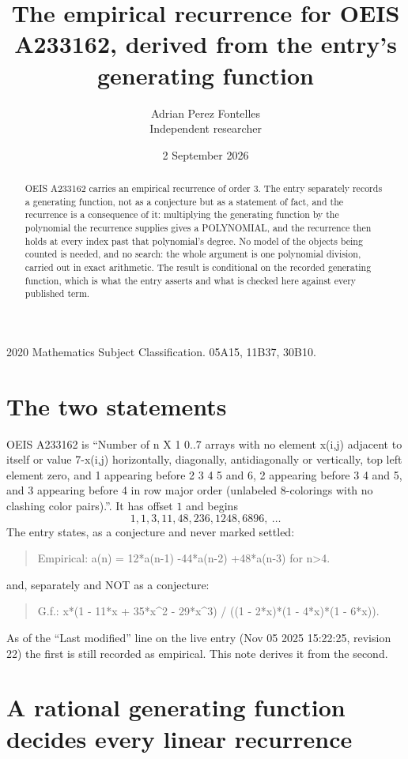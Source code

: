 \documentclass[11pt,a4paper]{article}
\title{The empirical recurrence for OEIS A233162, derived from the entry's generating function}
\author{Adrian Perez Fontelles\\ \small Independent researcher}
\date{2 September 2026}
\theoremstyle{plain}
\theoremstyle{definition}
\begin{document}
\maketitle

\begin{abstract}
OEIS A233162 carries an empirical recurrence of order $3$. The entry separately records a
generating function, not as a conjecture but as a statement of fact, and the recurrence is a
consequence of it: multiplying the generating function by the polynomial the recurrence
supplies gives a POLYNOMIAL, and the recurrence then holds at every index past that
polynomial's degree. No model of the objects being counted is needed, and no search: the
whole argument is one polynomial division, carried out in exact arithmetic. The result is
conditional on the recorded generating function, which is what the entry asserts and what is
checked here against every published term.
\end{abstract}

\noindent\small 2020 Mathematics Subject Classification. 05A15, 11B37, 30B10.\normalsize

\section{The two statements}

OEIS A233162 is ``Number of n X 1 0..7 arrays with no element x(i,j) adjacent to itself or value 7-x(i,j) horizontally, diagonally, antidiagonally or vertically, top left element zero, and 1 appearing before 2 3 4 5 and 6, 2 appearing before 3 4 and 5, and 3 appearing before 4 in row major order (unlabeled 8-colorings with no clashing color pairs).''. It has offset $1$ and begins
\[
1, 1, 3, 11, 48, 236, 1248, 6896,\ \dots
\]
The entry states, as a conjecture and never marked settled:
\begin{quote}
Empirical: a(n) = 12*a(n-1) -44*a(n-2) +48*a(n-3) for n>4.
\end{quote}
and, separately and NOT as a conjecture:
\begin{quote}
G.f.: x*(1 - 11*x + 35*x\^{}2 - 29*x\^{}3) / ((1 - 2*x)*(1 - 4*x)*(1 - 6*x)).
\end{quote}
As of the ``Last modified'' line on the live entry (Nov 05 2025 15:22:25, revision 22) the first is still
recorded as empirical. This note derives it from the second.

\section{A rational generating function decides every linear recurrence}
\end{document}
